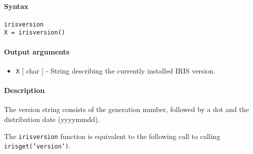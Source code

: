


	\paragraph{Syntax}\label{syntax}

\begin{verbatim}
irisversion
X = irisversion()
\end{verbatim}

\paragraph{Output arguments}\label{output-arguments}

\begin{itemize}
\itemsep1pt\parskip0pt
\item
  \texttt{X} {[} char {]} - String describing the currently installed
  IRIS version.
\end{itemize}

\paragraph{Description}\label{description}

The version string consists of the generation number, followed by a dot
and the distribution date (yyyymmdd).

The \texttt{irisversion} function is equivalent to the following call to
calling \texttt{irisget('version')}.


